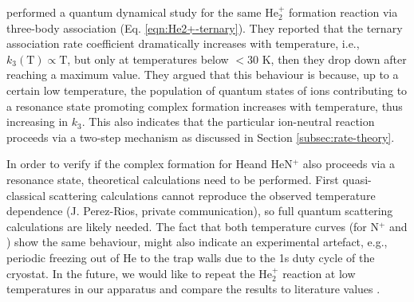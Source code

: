 \citet{xie_quantum_2003} performed a quantum dynamical study for the same He$_2^+$ formation reaction via three-body association (Eq. \ref{eqn:He2+-ternary}). They reported that the ternary association rate coefficient dramatically increases with temperature, i.e., $k_3(\text{T}) \propto \text{T}$, but only at temperatures below $< 30$ K, then they drop down after reaching a maximum value. They argued that this behaviour is because, up to a certain low temperature, the population of quantum states of ions contributing to a resonance state promoting complex formation increases with temperature, thus increasing in $k_3$. This also indicates that the particular ion-neutral reaction proceeds via a two-step mechanism as discussed in Section \ref{subsec:rate-theory}.

In order to verify if the complex formation for He\CD and HeN$^+$ also proceeds
via a resonance state, theoretical calculations need to be performed. First
quasi-classical scattering calculations cannot reproduce the observed
temperature dependence (J. Perez-Rios, private communication), so full quantum
scattering calculations are likely needed. The fact that both temperature
curves (for N$^+$ and \CD) show the same behaviour, might also indicate an
experimental artefact, e.g., periodic freezing out of He to the trap walls due
to the 1s duty cycle of the cryostat. In the future, we would like to repeat
the He$_2^+$ reaction at low temperatures in our apparatus and compare the
results to literature values \cite{bohringer_temperature_1983,
    plasil_stabilization_2012, gerlich_infrared_2018}.

